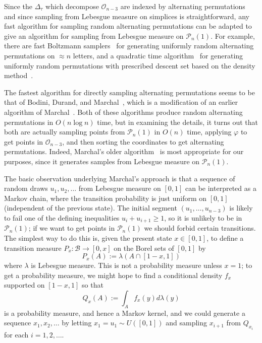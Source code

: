 \documentclass{article}
\theoremstyle{definition}
\begin{document}
Since the $\Delta_\tau$ which decompose $\mathcal{O}_{n-3}$ are indexed by alternating permutations and since sampling from Lebesgue measure on simplices is straightforward, any fast algorithm for sampling random alternating permutations can be adapted to give an algorithm for sampling from Lebesgue measure on $\mathcal{P}_n(1)$. For example, there are fast Boltzmann samplers~\cite{bodiniBoltzmannSamplersFirstorder2012,duchonBoltzmannSamplersRandom2004} for generating uniformly random alternating permutations on $\approx n$ letters, and a quadratic time algorithm~\cite{marchalDensityMethodPermutations2018} for generating uniformly random permutations with prescribed descent set based on the density method~\cite{banderierRectangularYoungTableaux2018,marchalRectangularYoungTableaux2020}.

The fastest algorithm for directly sampling alternating permutations seems to be that of Bodini, Durand, and Marchal~\cite{bodiniOptimalGenerationStrictly2024}, which is a modification of an earlier algorithm of Marchal~\cite{marchalGeneratingRandomAlternating2012}. Both of these algorithms produce random alternating permutations in $O(n \log n)$ time, but in examining the details, it turns out that both are actually sampling points from $\mathcal{P}_n(1)$ in $O(n)$ time, applying $\varphi$ to get points in $\mathcal{O}_{n-3}$, and then sorting the coordinates to get alternating permutations. Indeed, Marchal's older algorithm~\cite{marchalGeneratingRandomAlternating2012} is most appropriate for our purposes, since it generates samples from Lebesgue measure on $\mathcal{P}_n(1)$.

The basic observation underlying Marchal's approach is that a sequence of random draws $u_1, u_2, \dots$ from Lebesgue measure on $[0,1]$ can be interpreted as a Markov chain, where the transition probability is just uniform on $[0,1]$ (independent of the previous state). The initial segment $(u_1, \dots , u_{n-3})$ is likely to fail one of the defining inequalities $u_i + u_{i+1} \geq 1$, so it is unlikely to be in $\mathcal{P}_n(1)$; if we want to get points in $\mathcal{P}_n(1)$ we should forbid certain transitions. The simplest way to do this is, given the present state $x \in [0,1]$, to define a transition measure $P_x: \mathcal{B} \to [0,x]$ on the Borel sets of $[0,1]$ by
\[
	P_x(A) := \lambda(A \cap [1-x,1])
\]
where $\lambda$ is Lebesgue measure. This is not a probability measure unless $x=1$; to get a probability measure, we might hope to find a conditional density $f_x$ supported on $[1-x,1]$ so that
\[
	Q_x(A) := \int_{A} f_x(y)d\lambda(y)
\]
is a probability measure, and hence a Markov kernel, and we could generate a sequence $x_1, x_2, \dots$ by letting $x_1 = u_1 \sim U([0,1])$ and sampling $x_{i+1}$ from $Q_{x_i}$ for each $i=1,2,\dots$.
\end{document}
